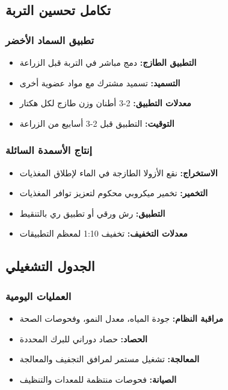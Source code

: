 \subsection{تكامل تحسين التربة}

\subsubsection{تطبيق السماد الأخضر}
\begin{itemize}
    \item \textbf{التطبيق الطازج:} دمج مباشر في التربة قبل الزراعة
    \item \textbf{التسميد:} تسميد مشترك مع مواد عضوية أخرى
    \item \textbf{معدلات التطبيق:} 2-3 أطنان وزن طازج لكل هكتار
    \item \textbf{التوقيت:} التطبيق قبل 2-3 أسابيع من الزراعة
\end{itemize}

\subsubsection{إنتاج الأسمدة السائلة}
\begin{itemize}
    \item \textbf{الاستخراج:} نقع الأزولا الطازجة في الماء لإطلاق المغذيات
    \item \textbf{التخمير:} تخمير ميكروبي محكوم لتعزيز توافر المغذيات
    \item \textbf{التطبيق:} رش ورقي أو تطبيق ري بالتنقيط
    \item \textbf{معدلات التخفيف:} تخفيف 1:10 لمعظم التطبيقات
\end{itemize}

\subsection{الجدول التشغيلي}

\subsubsection{العمليات اليومية}
\begin{itemize}
    \item \textbf{مراقبة النظام:} جودة المياه، معدل النمو، وفحوصات الصحة
    \item \textbf{الحصاد:} حصاد دوراني للبرك المحددة
    \item \textbf{المعالجة:} تشغيل مستمر لمرافق التجفيف والمعالجة
    \item \textbf{الصيانة:} فحوصات منتظمة للمعدات والتنظيف
\end{itemize}

